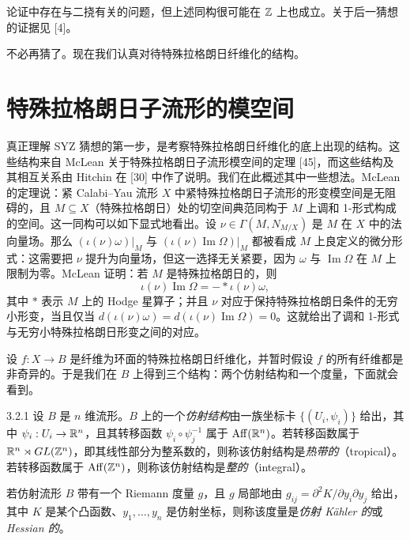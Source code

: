 论证中存在与二挠有关的问题，但上述同构很可能在 $\mathbb{Z}$ 上也成立。关于后一猜想的证据见 [4]。

不必再猜了。现在我们认真对待特殊拉格朗日纤维化的结构。

\section{特殊拉格朗日子流形的模空间}

真正理解 SYZ 猜想的第一步，是考察特殊拉格朗日纤维化的底上出现的结构。这些结构来自 McLean 关于特殊拉格朗日子流形模空间的定理 [45]，而这些结构及其相互关系由 Hitchin 在 [30] 中作了说明。我们在此概述其中一些想法。McLean 的定理说：紧 Calabi--Yau 流形 $X$ 中紧特殊拉格朗日子流形的形变模空间是无阻碍的，且 $M\subseteq X$（特殊拉格朗日）处的切空间典范同构于 $M$ 上调和 1-形式构成的空间。这一同构可以如下显式地看出。设 $\nu\in\Gamma(M,N_{M/X})$ 是 $M$ 在 $X$ 中的法向量场。那么 $(\iota(\nu)\omega)|_M$ 与 $(\iota(\nu)\operatorname{Im}\Omega)|_M$ 都被看成 $M$ 上良定义的微分形式：这需要把 $\nu$ 提升为向量场，但这一选择无关紧要，因为 $\omega$ 与 $\operatorname{Im}\Omega$ 在 $M$ 上限制为零。McLean 证明：若 $M$ 是特殊拉格朗日的，则
\[
\iota(\nu)\operatorname{Im}\Omega=-*\iota(\nu)\omega,
\]
其中 $*$ 表示 $M$ 上的 Hodge 星算子；并且 $\nu$ 对应于保持特殊拉格朗日条件的无穷小形变，当且仅当 $d(\iota(\nu)\omega)=d(\iota(\nu)\operatorname{Im}\Omega)=0$。这就给出了调和 1-形式与无穷小特殊拉格朗日形变之间的对应。

设 $f:X\to B$ 是纤维为环面的特殊拉格朗日纤维化，并暂时假设 $f$ 的所有纤维都是非奇异的。于是我们在 $B$ 上得到三个结构：两个仿射结构和一个度量，下面就会看到。

\begin{definition}{3.2.1}
设 $B$ 是 $n$ 维流形。$B$ 上的一个\emph{仿射结构}由一族坐标卡 $\{(U_i,\psi_i)\}$ 给出，其中 $\psi_i:U_i\to\mathbb{R}^n$，且其转移函数 $\psi_i\circ\psi_j^{-1}$ 属于 $\operatorname{Aff}(\mathbb{R}^n)$。若转移函数属于 $\mathbb{R}^n\rtimes GL(\mathbb{Z}^n)$，即其线性部分为整系数的，则称该仿射结构是\emph{热带的}（tropical）。若转移函数属于 $\operatorname{Aff}(\mathbb{Z}^n)$，则称该仿射结构是\emph{整的}（integral）。
\end{definition}


若仿射流形 $B$ 带有一个 Riemann 度量 $g$，且 $g$ 局部地由 $g_{ij}=\partial^2K/\partial y_i\partial y_j$ 给出，其中 $K$ 是某个凸函数、$y_1,\dots,y_n$ 是仿射坐标，则称该度量是\emph{仿射 Kähler 的}或 \emph{Hessian 的}。


